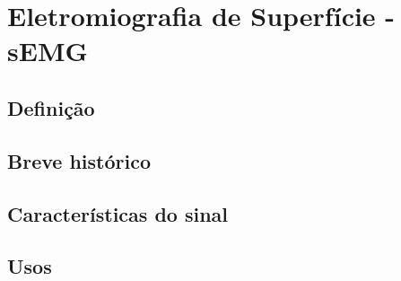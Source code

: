 \chapter{Eletromiografia de Superfície - sEMG}

\section{Definição}
\section{Breve histórico}
\section{Características do sinal}
\section{Usos}
